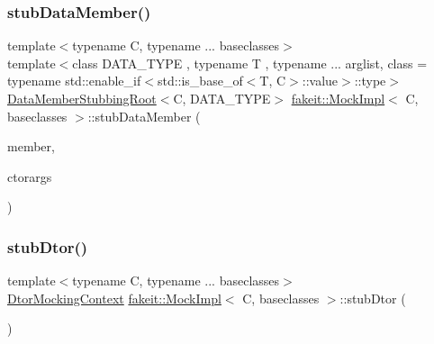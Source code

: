 \mbox{\label{classfakeit_1_1MockImpl_acaa4bcb3984d3ca5fd1ecb3095393951}} 
\subsubsection{\texorpdfstring{stubDataMember()}{stubDataMember()}\hspace{0.1cm}{\footnotesize\ttfamily [9/9]}}
{\footnotesize\ttfamily template$<$typename C, typename ... baseclasses$>$ \\
template$<$class D\+A\+T\+A\+\_\+\+T\+Y\+PE , typename T , typename ... arglist, class  = typename std\+::enable\+\_\+if$<$std\+::is\+\_\+base\+\_\+of$<$\+T, C$>$\+::value$>$\+::type$>$ \\
\mbox{\hyperlink{classfakeit_1_1DataMemberStubbingRoot}{Data\+Member\+Stubbing\+Root}}$<$C, D\+A\+T\+A\+\_\+\+T\+Y\+PE$>$ \mbox{\hyperlink{classfakeit_1_1MockImpl}{fakeit\+::\+Mock\+Impl}}$<$ C, baseclasses $>$\+::stub\+Data\+Member (\begin{DoxyParamCaption}\item[{D\+A\+T\+A\+\_\+\+T\+Y\+PE T\+::$\ast$}]{member,  }\item[{const arglist \&...}]{ctorargs }\end{DoxyParamCaption})\hspace{0.3cm}{\ttfamily [inline]}}

\mbox{\label{classfakeit_1_1MockImpl_ae64cb908c91a96faefbf0fabac948f29}} 
\subsubsection{\texorpdfstring{stubDtor()}{stubDtor()}\hspace{0.1cm}{\footnotesize\ttfamily [1/9]}}
{\footnotesize\ttfamily template$<$typename C, typename ... baseclasses$>$ \\
\mbox{\hyperlink{classfakeit_1_1DtorMockingContext}{Dtor\+Mocking\+Context}} \mbox{\hyperlink{classfakeit_1_1MockImpl}{fakeit\+::\+Mock\+Impl}}$<$ C, baseclasses $>$\+::stub\+Dtor (\begin{DoxyParamCaption}{ }\end{DoxyParamCaption})\hspace{0.3cm}{\ttfamily [inline]}}

